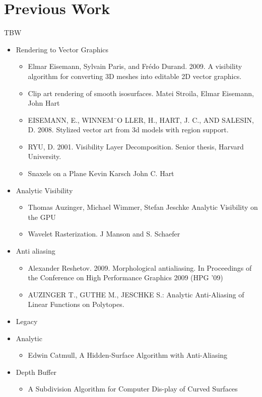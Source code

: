 \documentclass[review]{acmsiggraph}
\begin{document}
\section{Previous Work}
TBW
\begin{itemize}
\item Rendering to Vector Graphics 
\begin{itemize}
\item Elmar Eisemann, Sylvain Paris, and Frédo Durand. 2009. A visibility algorithm for converting 3D meshes into editable 2D vector graphics. 
\item Clip art rendering of smooth isosurfaces. Matei Stroila, Elmar Eisemann, John Hart
\item EISEMANN, E., WINNEM¨O LLER, H., HART, J. C., AND SALESIN, D. 2008. Stylized vector art from 3d models with region support.
\item RYU, D. 2001. Visibility Layer Decomposition. Senior thesis, Harvard University.
\item Snaxels on a Plane Kevin Karsch John C. Hart 
\end{itemize}
\item Analytic Visibility
\begin{itemize}
\item Thomas Auzinger, Michael Wimmer, Stefan Jeschke Analytic Visibility on the GPU
\item Wavelet Rasterization. J  Manson and S. Schaefer
\end{itemize}
\item Anti aliasing
\begin{itemize}
\item Alexander Reshetov. 2009. Morphological antialiasing. In Proceedings of the Conference on High Performance Graphics 2009 (HPG '09)
\item AUZINGER T., GUTHE M., JESCHKE S.: Analytic Anti-Aliasing of Linear Functions on Polytopes.
\end{itemize}
\item Legacy 
\item Analytic
\begin{itemize}
\item Edwin Catmull, A Hidden-Surface Algorithm with Anti-Aliasing
\end{itemize}
\item Depth Buffer
\begin{itemize}
\item A Subdivision Algorithm for Computer Dis-play of Curved Surfaces
\end{itemize}

\end{itemize}
\end{document}
